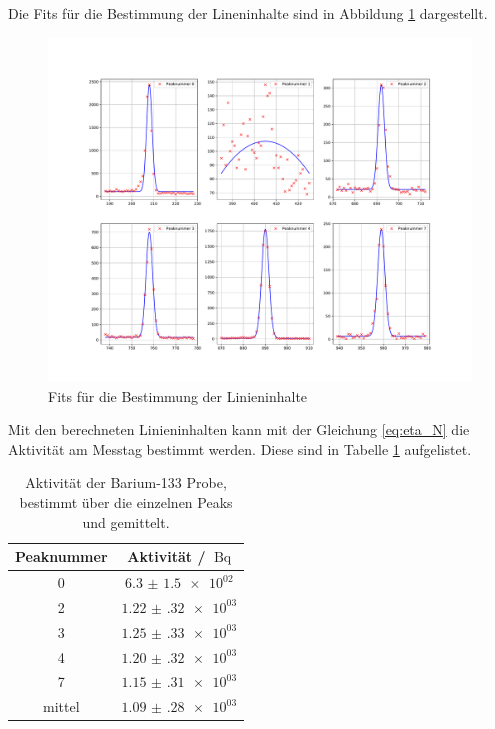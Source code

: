 \FloatBarrier
Die Fits für die Bestimmung der Lineninhalte sind in Abbildung \ref{fig:Linieninhalt_03} dargestellt.
\FloatBarrier
\begin{figure}
  \centering
  \includegraphics[width=\textwidth,keepaspectratio]{figure/03_subplot.pdf}
  \caption{Fits für die Bestimmung der Linieninhalte}
  \label{fig:Linieninhalt_03}
\end{figure}
Mit den berechneten Linieninhalten kann mit der Gleichung \eqref{eq:eta_N} die Aktivität am Messtag bestimmt werden. 
Diese sind in Tabelle \ref{tab:Akti_03} aufgelistet.
\FloatBarrier
\begin{table}
  \centering
  \caption{Aktivität der Barium-133 Probe, bestimmt über die einzelnen Peaks und gemittelt.}
  \label{tab:Akti_03}
  \begin{tabular}{c c}
    \toprule
    Peaknummer & Aktivität / $\SI{}{\becquerel}$\\
    \midrule
    0&$\num{6.3(15)e+02}$\\
    2&$\num{1.22(32)e+03}$\\
    3&$\num{1.25(33)e+03}$\\
    4&$\num{1.20(32)e+03}$\\
    7&$\num{1.15(31)e+03}$\\
    \midrule
    mittel& $\num{1.09(28)e+03}$\\
    \bottomrule
  \end{tabular}
\end{table}
